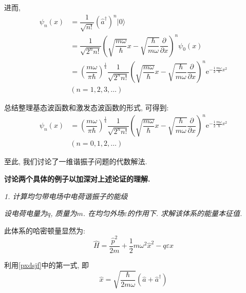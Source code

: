 \documentclass[a4paper, 11pt]{article}
\begin{document}
\begin{spacing}{1.2}
        进而, 
        \begin{equation}
          \begin{aligned}
            \psi_n(x) &= \dfrac{1}{\sqrt{n!}}\left(\hat{a}^{\dagger}\right)^n|0\rangle\\
            &= \dfrac{1}{\sqrt{2^nn!}}\left(\sqrt{\dfrac{m\omega}{\hbar}}x-%
            \sqrt{\dfrac{\hbar}{m\omega}}\dfrac{\partial}{\partial{}x}\right)^n\psi_0(x)\\
            &= \left(\dfrac{m\omega}{\pi\hbar}\right)^{\frac{1}{4}}%
            \dfrac{1}{\sqrt{2^nn!}}\left(\sqrt{\dfrac{m\omega}{\hbar}}x-%
            \sqrt{\dfrac{\hbar}{m\omega}}\dfrac{\partial}{\partial{}x}\right)^n%
            \mathrm{e}^{-\frac{1}{2}\frac{m\omega}{\hbar}x^2}\\
            &(n=1,2,3,\ldots)
          \end{aligned}
        \end{equation}

        总结整理基态波函数和激发态波函数的形式, 可得到:
        \begin{equation}
          \begin{aligned}
            \psi_n(x)&= \left(\dfrac{m\omega}{\pi\hbar}\right)^{\frac{1}{4}}%
            \dfrac{1}{\sqrt{2^nn!}}\left(\sqrt{\dfrac{m\omega}{\hbar}}x-%
            \sqrt{\dfrac{\hbar}{m\omega}}\dfrac{\partial}{\partial{}x}\right)^n%
            \mathrm{e}^{-\frac{1}{2}\frac{m\omega}{\hbar}x^2}\\
            &(n=0,1,2,\ldots)
          \end{aligned}
        \end{equation}

        至此, 我们讨论了一维谐振子问题的代数解法. 

        \textbf{讨论两个具体的例子以加深对上述论证的理解.}

        \emph{1. 计算均匀带电场中电荷谐振子的能级}

        \emph{设电荷电量为$q$, 质量为$m$. 在均匀外场$\varepsilon$的作用下. 求解该体系的能量本征值.}

        此体系的哈密顿量显然为:
        \begin{equation}
          \hat{H} = \dfrac{\hat{p}^2}{2m}+\dfrac{1}{2}m\omega^2\hat{x}^2-q\varepsilon\hat{x}
        \end{equation}

        利用\eqref{pxdsjf}中的第一式, 即
        \begin{equation*}
          \hat{x} = \sqrt{\dfrac{\hbar}{2m\omega}}\left(\hat{a}+\hat{a}^{\dagger}\right)
        \end{equation*}


\end{spacing}
\end{document}
